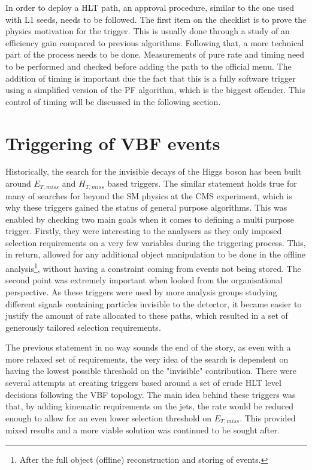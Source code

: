 \hspace{10pt} In order to deploy a HLT path, an approval procedure, similar to the one used with L1 seeds, needs to be followed. The first item on the checklist is to prove the physics motivation for the trigger. This is usually done through a study of an efficiency gain compared to previous algorithms. Following that, a more technical part of the process needs to be done. Measurements of pure rate and timing need to be performed and checked before adding the path to the official menu. The addition of timing is important due the fact that this is a fully software trigger using a simplified version of the PF algorithm, which is the biggest offender. This control of timing will be discussed in the following section.

\section{Triggering of VBF events}
\label{sec:vbf_trgger}
\hspace{10pt}Historically, the search for the invisible decays of the Higgs boson has been built around $E_{T,miss}$ and $H_{T,miss}$ based triggers. The similar statement holds true for many of searches for beyond the SM physics at the CMS experiment, which is why these triggers gained the status of general purpose algorithms. This was enabled by checking two main goals when it comes to defining a multi purpose trigger. Firstly, they were interesting to the analysers as they only imposed selection requirements on a very few variables during the triggering process. This, in return, allowed for any additional object manipulation to be done in the offline analysis\footnote{After the full object (offline) reconstruction and storing of events.}, without having a constraint coming from events not being stored. The second point was extremely important when looked from the organisational perspective. As these triggers were used by more analysis groups studying different signals containing particles invisible to the detector, it became easier to justify the amount of rate allocated to these paths, which resulted in a set of generously tailored selection requirements.

\hspace{10pt} The previous statement in no way sounds the end of the story, as even with a more relaxed set of requirements, the very idea of the search is dependent on having the lowest possible threshold on the "invisible" contribution. There were several attempts at creating triggers based around a set of crude HLT level decisions following the VBF topology. The main idea behind these triggers was that, by adding kinematic requirements on the jets, the rate would be reduced enough to allow for an even lower selection threshold on $E_{T,miss}$. This provided mixed results and a more viable solution was continued to be sought after.


